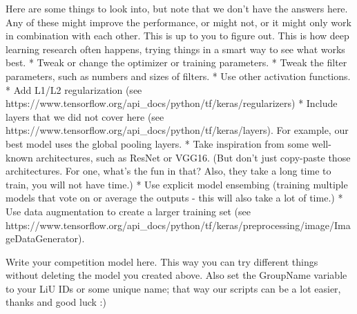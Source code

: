 \documentclass[11pt]{article}
\begin{document}
Here are some things to look into, but note that we don't have the
answers here. Any of these might improve the performance, or might not,
or it might only work in combination with each other. This is up to you
to figure out. This is how deep learning research often happens, trying
things in a smart way to see what works best. * Tweak or change the
optimizer or training parameters. * Tweak the filter parameters, such as
numbers and sizes of filters. * Use other activation functions. * Add
L1/L2 regularization (see
https://www.tensorflow.org/api\_docs/python/tf/keras/regularizers) *
Include layers that we did not cover here (see
https://www.tensorflow.org/api\_docs/python/tf/keras/layers). For
example, our best model uses the global pooling layers. * Take
inspiration from some well-known architectures, such as ResNet or VGG16.
(But don't just copy-paste those architectures. For one, what's the fun
in that? Also, they take a long time to train, you will not have time.)
* Use explicit model ensembing (training multiple models that vote on or
average the outputs - this will also take a lot of time.) * Use data
augmentation to create a larger training set (see
https://www.tensorflow.org/api\_docs/python/tf/keras/preprocessing/image/ImageDataGenerator).

Write your competition model here. This way you can try different things
without deleting the model you created above. Also set the GroupName
variable to your LiU IDs or some unique name; that way our scripts can
be a lot easier, thanks and good luck :)
\end{document}
